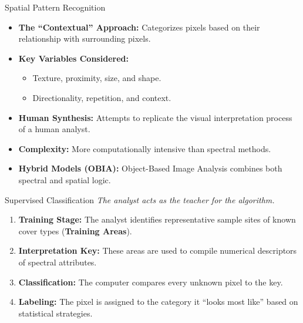 \documentclass[aspectratio=169]{beamer}
\begin{document}
\begin{frame}{Spatial Pattern Recognition}
    \begin{itemize}
        \item \textbf{The ``Contextual'' Approach:} Categorizes pixels based on their relationship with surrounding pixels.
        \item \textbf{Key Variables Considered:}
        \begin{itemize}
            \item Texture, proximity, size, and shape.
            \item Directionality, repetition, and context.
        \end{itemize}
        \item \textbf{Human Synthesis:} Attempts to replicate the visual interpretation process of a human analyst.
        \item \textbf{Complexity:} More computationally intensive than spectral methods.
        \item \textbf{Hybrid Models (OBIA):} Object-Based Image Analysis combines both spectral and spatial logic.
    \end{itemize}
\end{frame}

\begin{frame}{Supervised Classification}
    \textit{The analyst acts as the teacher for the algorithm.}
    \vspace{0.3cm}
    \begin{enumerate}
        \item \textbf{Training Stage:} The analyst identifies representative sample sites of known cover types (\textbf{Training Areas}).
        \item \textbf{Interpretation Key:} These areas are used to compile numerical descriptors of spectral attributes.
        \item \textbf{Classification:} The computer compares every unknown pixel to the key.
        \item \textbf{Labeling:} The pixel is assigned to the category it ``looks most like'' based on statistical strategies.
    \end{enumerate}
\end{frame}
\end{document}
